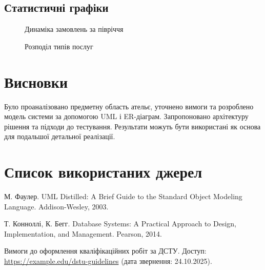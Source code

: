 \documentclass[14pt,a4paper]{extarticle}
\begin{document}
\subsection{Статистичні графіки}
\begin{figure}[H]
  \centering
  \caption{Динаміка замовлень за півріччя}
\end{figure}

\begin{figure}[H]
  \centering
  \caption{Розподіл типів послуг}
\end{figure}

\section{Висновки}
Було проаналізовано предметну область ательє, уточнено вимоги та розроблено модель системи за допомогою UML і ER-діаграм. Запропоновано архітектуру рішення та підходи до тестування. Результати можуть бути використані як основа для подальшої детальної реалізації.

\section*{Список використаних джерел}
\begin{thebibliography}{9}
М. Фаулер. UML Distilled: A Brief Guide to the Standard Object Modeling Language. Addison-Wesley, 2003.

Т. Конноллі, К. Бегг. Database Systems: A Practical Approach to Design, Implementation, and Management. Pearson, 2014.

Вимоги до оформлення кваліфікаційних робіт за ДСТУ. Доступ: \url{https://example.edu/dstu-guidelines} (дата звернення: 24.10.2025).
\end{thebibliography}
\end{document}
